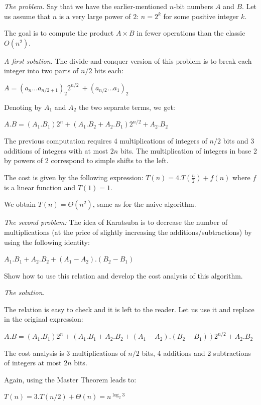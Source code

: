 \noindent \textit{The problem.}
Say that we have the earlier-mentioned $n$-bit numbers $A$ and $B$.  Let us assume that $n$ is a very large power of $2$: $n=2^k$ for some positive integer $k$.

The goal is to compute the product $A \times B$ in fewer operations than the classic $O(n^2)$.

\medskip

\noindent \textit{A first solution.}
The divide-and-conquer version of this problem is to break each integer into two parts
of $n/2$ bits each:

$A=(a_n\ldots a_{n/2+1})_2 2^{n/2}\ + (a_{n/2}\ldots a_1)_2$

Denoting by $A_1$ and $A_2$ the two separate terms, we get:

$A.B = (A_1.B_1) 2^n + (A_1.B_2 + A_2.B_1) 2^{n/2} + A_2.B_2$
\medskip

The previous computation requires 4 multiplications of integers of $n/2$ bits 
and 3 additions of integers with at most $2n$ bits. The multiplication of integers in base 2 by powers of 2 
correspond to simple shifts to the left. 

The cost is given by the following expression: $T(n) = 4.T(\frac{n}{2}) + f(n)$ where $f$ is a linear function
and $T(1) = 1$.

We obtain $T(n) = \Theta(n^2)$, same as for the naive algorithm.
\bigskip
 
\noindent \textit{The second problem:}
The idea of Karatsuba is to decrease the number of multiplications 
(at the price of slightly increasing the additions/subtractions) by using the following identity:

$A_1.B_1 + A_2.B_2 + (A_1-A_2).(B_2-B_1)$

Show how to use this relation and develop the cost analysis of this algorithm.
\medskip

\noindent \textit{The solution.}

The relation is easy to check and it is left to the reader. 
Let us use it and replace in the original expression:

$A.B = (A_1.B_1) 2^n + (A_1.B_1 + A_2.B_2 + (A_1-A_2).(B_2-B_1)) 2^{n/2} + A_2.B_2$

The cost analysis is 3 multiplications of $n/2$ bits,
4 additions and 2 subtractions of integers at most $2n$ bits. 

Again, using the Master Theorem leads to:

$T(n) = 3.T(n/2) + \Theta (n) = n^{\log_2 3}$
\medskip

